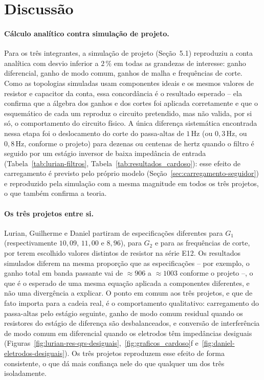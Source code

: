 \documentclass[11pt,a4paper]{article}
\begin{document}
\section{Discussão}
\label{sec:discussao}

\paragraph{Cálculo analítico contra simulação de projeto.} Para os três integrantes, a simulação de projeto (Seção~5.1) reproduziu a conta analítica com desvio inferior a \(2\,\%\) em todas as grandezas de interesse: ganho diferencial, ganho de modo comum, ganhos de malha e frequências de corte. Como as topologias simuladas usam componentes ideais e os mesmos valores de resistor e capacitor da conta, essa concordância é o resultado esperado -- ela confirma que a álgebra dos ganhos e dos cortes foi aplicada corretamente e que o esquemático de cada um reproduz o circuito pretendido, mas não valida, por si só, o comportamento do circuito físico. A única diferença sistemática encontrada nessa etapa foi o deslocamento do corte do passa-altas de \(1\,\text{Hz}\) (ou \(0{,}3\,\text{Hz}\), ou \(0{,}8\,\text{Hz}\), conforme o projeto) para dezenas ou centenas de hertz quando o filtro é seguido por um estágio inversor de baixa impedância de entrada (Tabela~\ref{tab:lurian-filtros}, Tabela~\ref{tab:resultados_cardoso}): esse efeito de carregamento é previsto pelo próprio modelo (Seção~\ref{sec:carregamento-seguidor}) e reproduzido pela simulação com a mesma magnitude em todos os três projetos, o que também confirma a teoria.

\paragraph{Os três projetos entre si.} Lurian, Guilherme e Daniel partiram de especificações diferentes para \(G_1\) (respectivamente \(10{,}09\), \(11{,}00\) e \(8{,}96\)), para \(G_2\) e para as frequências de corte, por terem escolhido valores distintos de resistor na série E12. Os resultados simulados diferem na mesma proporção que as especificações -- por exemplo, o ganho total em banda passante vai de \(\approx906\) a \(\approx1003\) conforme o projeto --, o que é o esperado de uma mesma equação aplicada a componentes diferentes, e não uma divergência a explicar. O ponto em comum aos três projetos, e que de fato importa para a cadeia real, é o comportamento qualitativo: carregamento do passa-altas pelo estágio seguinte, ganho de modo comum residual quando os resistores do estágio de diferença são desbalanceados, e conversão de interferência de modo comum em diferencial quando os eletrodos têm impedâncias desiguais (Figuras~\ref{fig:lurian-res-qrs-desiguais},~\ref{fig:graficos_cardoso}f e~\ref{fig:daniel-eletrodos-desiguais}). Os três projetos reproduzem esse efeito de forma consistente, o que dá mais confiança nele do que qualquer um dos três isoladamente.
\end{document}
